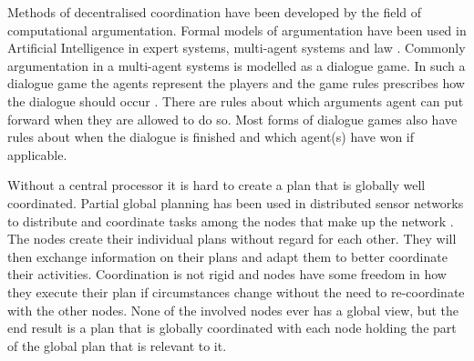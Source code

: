 Methods of decentralised coordination have been developed by the field of
computational argumentation. Formal models of argumentation have been used in 
Artificial Intelligence in expert systems, multi-agent systems and law
\cite{vaneemeren2014}. Commonly argumentation in a multi-agent systems is 
modelled as a dialogue game. In such a dialogue game the agents represent the 
players and the game rules prescribes how the dialogue should occur 
\cite{walton1995}. There are rules about which arguments agent can put forward 
when they are allowed to do so. Most forms of dialogue games also have rules 
about when the dialogue is finished and which agent(s) have won if applicable.

Without a central processor it is hard to create a plan that is globally well
coordinated. Partial global planning has been used in distributed sensor 
networks to distribute and coordinate tasks among the nodes that make up the 
network \cite{durfee1991}. The nodes create their individual plans without 
regard for each other. They will then exchange information on their plans and 
adapt them to better coordinate their activities. Coordination is not rigid and 
nodes have some freedom in how they execute their plan if circumstances change 
without the need to re-coordinate with the other nodes. None of the involved 
nodes ever has a global view, but the end result is a plan that is globally 
coordinated with each node holding the part of the global plan that is relevant 
to it.


